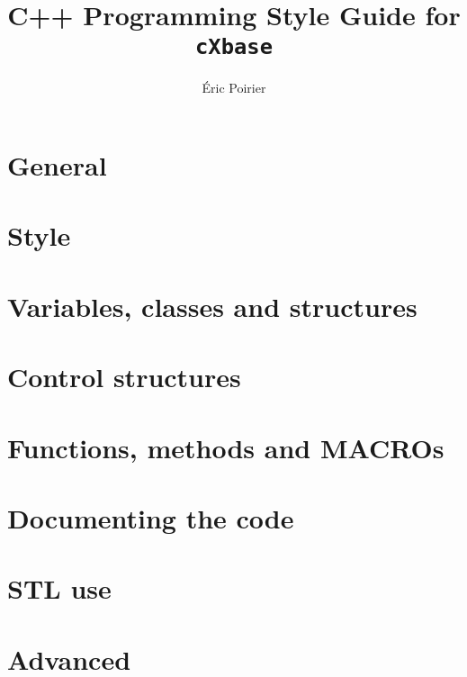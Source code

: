 \documentclass{report}
\newcommand{\files}{./files/}
\begin{document}
\title{C++ Programming Style Guide for \texttt{cXbase}}
\author{Éric Poirier}
\maketitle


\chapter{General}                              
\chapter{Style}                                
\chapter{Variables, classes and structures}    
\chapter{Control structures}                   

\chapter{Functions, methods and MACROs}
\chapter{Documenting the code}
\chapter{STL use}
\chapter{Advanced}
\end{document}
